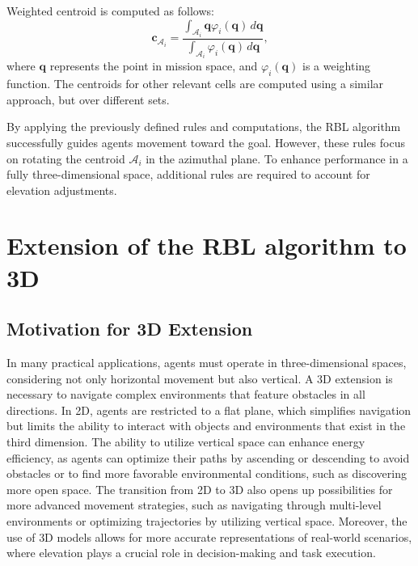         Weighted centroid is computed as follows:        
        \begin{equation}
            \mathbf{c}_{\mathcal{A}_i} = \frac{\int_{\mathcal{A}_i} \mathbf{q} \varphi_i(\mathbf{q}) \, d\mathbf{q}}{\int_{\mathcal{A}_i} \varphi_i(\mathbf{q}) \, d\mathbf{q}},
        \end{equation}
        where \( \mathbf{q} \) represents the point in mission space, and \( \varphi_i(\mathbf{q}) \) is a weighting function. 
        The centroids for other relevant cells are computed using a similar approach, but over different sets.

        By applying the previously defined rules and computations, the RBL algorithm successfully guides agents movement toward the goal.
        However, these rules focus on rotating the centroid $\mathcal{A}_i$ in the azimuthal plane. 
        To enhance performance in a fully three-dimensional space, additional rules are required to account for elevation adjustments. 

\section{Extension of the RBL algorithm to 3D}
    \subsection{Motivation for \ac{3D} Extension}
        In many practical applications, agents must operate in three-dimensional spaces, considering not only horizontal movement but also vertical.
        A \ac{3D} extension is necessary to navigate complex environments that feature obstacles in all directions.
        In \ac{2D}, agents are restricted to a flat plane, which simplifies navigation but limits the ability to interact with objects and environments that exist in the third dimension.
        The ability to utilize vertical space can enhance energy efficiency, as agents can optimize their paths by ascending or descending to avoid obstacles or to find more favorable environmental conditions, such as discovering more open space.
        The transition from \ac{2D} to \ac{3D} also opens up possibilities for more advanced movement strategies, such as navigating through multi-level environments or optimizing trajectories by utilizing vertical space.  
        Moreover, the use of \ac{3D} models allows for more accurate representations of real-world scenarios, where elevation plays a crucial role in decision-making and task execution.


